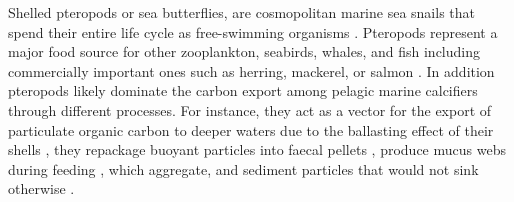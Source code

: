 
Shelled pteropods or sea butterflies, are cosmopolitan marine sea snails that spend their entire life cycle as free-swimming organisms \citep{Bednarsek2012PteropodDistribution,SuarezMorales2009Gastropods}. Pteropods represent a  major food source for other zooplankton, seabirds, whales, and fish \citep[][]{FalkPetersen2001Trophic,Hunt2008TopPredators} including commercially important ones such as herring, mackerel, or salmon \citep{LeBrasseur1966FishPteropods,lalli1989pelagic}.
In addition pteropods likely dominate the carbon export among pelagic marine calcifiers \citep{Buitenhuis2019CalciteExportPteropods} through different processes. For instance, they act as a vector for the export of particulate organic carbon to deeper waters due to the ballasting effect of their shells \citep{Klaas2002Ballast}, they repackage buoyant particles into faecal pellets \citep{Treguer2003FecalPellets,Manno2009FeacalPellets}, produce mucus webs during feeding \citep{Gilmer1972FeedingBehaviour}, which aggregate, and sediment particles that would not sink otherwise \citep{Noji1997Aggregation}.


